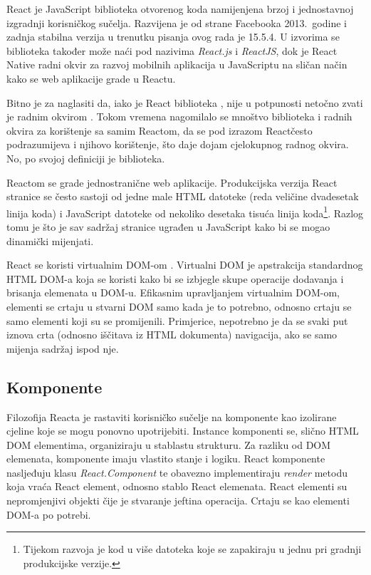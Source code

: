 \documentclass[times, utf8, zavrsni, numeric]{fer}
\newcommand{\razmakp}{\vspace{18pt}}
\begin{document}
React je JavaScript biblioteka otvorenog koda namijenjena brzoj i jednostavnoj izgradnji korisničkog sučelja. Razvijena je od strane Facebooka 2013.\ godine i zadnja stabilna verzija u trenutku pisanja ovog rada je 15.5.4.\citep{reactWiki}
U izvorima se biblioteka također može naći pod nazivima \emph{React.js} i \emph{ReactJS}, dok je React Native radni okvir za razvoj mobilnih aplikacija u JavaScriptu na sličan način kako se web aplikacije grade u Reactu.

Bitno je za naglasiti da, iako je React biblioteka , nije u potpunosti netočno zvati je radnim okvirom .
Tokom vremena nagomilalo se mnoštvo biblioteka i radnih okvira za korištenje sa samim Reactom, da se pod izrazom \glqq React\grqq često podrazumijeva i njihovo korištenje, što daje dojam cjelokupnog radnog okvira.
No, po svojoj definiciji je biblioteka.\citep{reactGithub}

\razmakp

Reactom se grade jednostranične  web aplikacije.
Produkcijska verzija React stranice se često sastoji od jedne male HTML datoteke (reda veličine dvadesetak linija koda) i JavaScript datoteke od nekoliko desetaka tisuća linija koda\footnote{Tijekom razvoja je kod u više datoteka koje se zapakiraju u jednu pri gradnji produkcijske verzije.}.
Razlog tomu je što je sav sadržaj stranice ugrađen u JavaScript kako bi se mogao dinamički mijenjati.

React se koristi virtualnim DOM-om .
Virtualni DOM je apstrakcija standardnog HTML DOM-a koja se koristi kako bi se izbjegle skupe operacije dodavanja i brisanja elemenata u DOM-u.
Efikasnim upravljanjem virtualnim DOM-om, elementi se crtaju u stvarni DOM samo kada je to potrebno, odnosno crtaju se samo elementi koji su se promijenili.
Primjerice, nepotrebno je da se svaki put iznova crta (odnosno iščitava iz HTML dokumenta) navigacija, ako se samo mijenja sadržaj ispod nje.

\razmakp

\subsection{Komponente}
Filozofija Reacta je rastaviti korisničko sučelje na komponente kao izolirane cjeline koje se mogu ponovno upotrijebiti.\citep{react}
Instance komponenti se, slično HTML DOM elementima, organiziraju u stablastu strukturu.
Za razliku od DOM elemenata, komponente imaju vlastito stanje i logiku.
React komponente nasljeđuju klasu \emph{React.Component} te obavezno implementiraju \emph{render} metodu koja vraća React element, odnosno stablo React elemenata.\citep{reactDocsComponent}
React elementi su nepromjenjivi objekti čije je stvaranje jeftina operacija.
Crtaju se kao elementi DOM-a po potrebi.\citep{reactDocsRenderElem}
\end{document}
